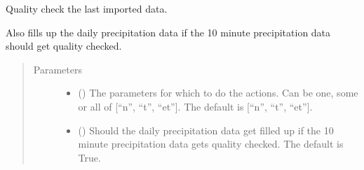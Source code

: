 \documentclass[letterpaper,10pt,english]{sphinxmanual}
\begin{document}
\begin{fulllineitems}
\begin{fulllineitems}
\end{fulllineitems}


\begin{fulllineitems}
\label{\detokenize{weatherDB:weatherDB.broker.Broker.last_imp_quality_check}}
\sphinxAtStartPar
Quality check the last imported data.

\sphinxAtStartPar
Also fills up the daily precipitation data if the 10 minute precipitation data should get quality checked.
\begin{quote}\begin{description}
\item[{Parameters}] \leavevmode\begin{itemize}
\item {} 
\sphinxAtStartPar
{} (\sphinxstyleliteralemphasis{\sphinxupquote{, }}) \textendash{} The parameters for which to do the actions.
Can be one, some or all of {[}“n”, “t”, “et”{]}.
The default is {[}“n”, “t”, “et”{]}.

\item {} 
\sphinxAtStartPar
{} (\sphinxstyleliteralemphasis{\sphinxupquote{, }}) \textendash{} Should the daily precipitation data get filled up if the 10 minute precipitation data gets quality checked.
The default is True.

\end{itemize}

\end{description}\end{quote}

\end{fulllineitems}



\end{fulllineitems}
\end{document}
